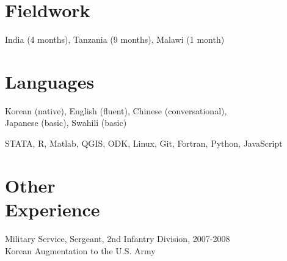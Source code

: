 \documentclass[letterpaper, margin, 10pt]{res} %
\newcommand{\blank}[1]{\hspace*{#1}\linebreak[0]}
\begin{document}
\begin{resume}
\section{Fieldwork}
India (4 months), Tanzania (9 months), Malawi (1 month)

\section{\sc \textbf{Languages}}
Korean (native), English (fluent), Chinese (conversational), \\ Japanese (basic), Swahili (basic)

STATA, R, Matlab, QGIS, ODK, Linux, Git, Fortran, Python, JavaScript

\section{\sc \textbf{Other \\ Experience}}
Military Service, Sergeant, 2nd Infantry Division, \hfill{2007-2008} \\
\blank{0.5cm} Korean Augmentation to the U.S. Army





\end{resume}
\end{document}
